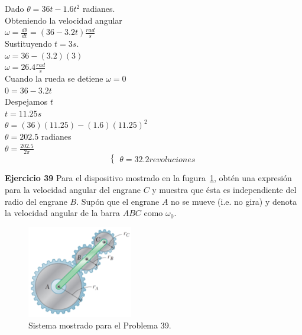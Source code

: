 \documentclass[a4paper,11pt]{scrartcl}
\begin{document}
\begin{center}

Dado $\theta = 36t - 1.6t^{2}$ radianes.\\
\hfill \break
Obteniendo la velocidad angular\\
\hfill \break
$\omega = \frac{d \theta}{d t} = (36 - 3.2 t) \frac{rad}{s}$\\
\hfill \break
Sustituyendo $t = 3 s$.\\
\hfill \break
$\omega = 36 - (3.2)(3)$\\
\hfill \break
$\omega = 26.4 \frac{rad}{s}$\\
\hfill \break
Cuando la rueda se detiene $\omega = 0$\\
\hfill \break
$0 = 36 - 3.2 t$\\
\hfill \break
Despejamos $t$\\
\hfill \break
$t = 11.25 s$\\
\hfill \break
$\theta = (36)(11.25) - (1.6)(11.25)^{2}$\\
\hfill \break
$\theta = 202.5$ radianes\\
\hfill \break
$\theta = \frac{202.5}{2 \pi}$\\
\begin{equation}
  \left\lbrace
  \begin{array}{l}
    \theta = 32.2 revoluciones
  \end{array}
  \right.
\end{equation}

 
\end{center}

\newpage

\textbf{Ejercicio 39} Para el dispositivo mostrado en la fugura~\ref{fig:39_1}, obtén una expresión para la velocidad angular del engrane $C$ y muestra que ésta es independiente del radio del engrane $B$. Supón que el
engrane $A$ no se mueve (i.e. no gira) y denota la velocidad angular de la barra $ABC$ como $\omega_{0}$.\\

\begin{figure}[H]
  \centering
  \includegraphics[height=4cm]{39_1}
  \caption{Sistema mostrado para el Problema 39.}
  \label{fig:39_1}
\end{figure}
\end{document}
